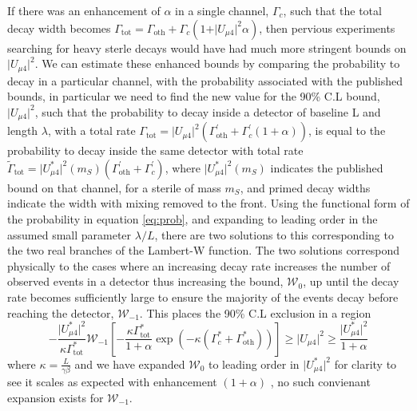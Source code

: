 \documentclass[11pt, a4paper]{article}
\begin{document}
If there was an enhancement of $\alpha$ in a single channel, $\Gamma_c$, such
that the total decay width becomes $\Gamma_\text{tot} =
\Gamma_\text{oth}+\Gamma_c (1+\vert U_{\mu 4}\vert^2 \alpha)$, then pervious
experiments searching for heavy sterle decays would have had much more
stringent bounds on $\vert U_{\mu 4} \vert^2$. We can estimate these enhanced
bounds by comparing the probability to decay in a particular channel, with the
probability associated with the published bounds, in particular we need to find
the new value for the 90\% C.L bound, $\vert U_{\mu 4}\vert^2$, such that the
probability to decay inside a detector of baseline L and length $\lambda$, with
a total rate  $\Gamma_\text{tot} = \vert U_{\mu 4}\vert^2
\left(\Gamma_\text{oth}^\prime+\Gamma_c^\prime (1+\alpha)\right)$, is equal to
the probability to decay inside the same detector with total rate
$\tilde{\Gamma}_\text{tot} = \vert U_{\mu 4}^*\vert^2(m_S)
\left(\Gamma_\text{oth}^\prime+\Gamma_c^\prime\right)$, where $\vert U_{\mu
4}^*\vert^2(m_S) $ indicates the published bound on that channel, for a sterile
of mass $m_S$, and primed decay widths indicate the width with mixing removed
to the front. Using the functional form of the probability in equation
\ref{eq:prob}, and expanding to leading order in the assumed small parameter
$\lambda/L$, there are two solutions to this corresponding to the two real
branches of the Lambert-W function. The two solutions correspond physically to
the cases where an increasing decay rate increases the number of observed
events in a detector thus increasing the bound, $\mathcal{W}_0$, up until the
decay rate becomes sufficiently large to ensure the majority of the events
decay before reaching the detector, $\mathcal{W}_{-1}$. This places the 90\%
C.L exclusion in a region \[	-\frac{\vert U_{\mu 4}^* \vert^2}{ \kappa
\Gamma_\text{tot}^{*}} \mathcal{W}_{-1} \left[-\frac{\kappa
\Gamma_\text{tot}^{*}}{1+\alpha} \exp\left(
-\kappa(\Gamma_c^*+\Gamma_\text{oth}^*) \right)     \right]	\geq \vert
U_{\mu 4} \vert^2 \geq \frac{\vert U_{\mu 4}^* \vert^2}{1+\alpha} \] where
$\kappa = \frac{L}{\gamma \beta}$ and we have expanded $\mathcal{W}_0$ to
leading order in $\vert U_{\mu 4}^*\vert^2$ for clarity to see it scales as
expected with enhancement $(1+\alpha)$ , no such convienant expansion exists
for  $\mathcal{W}_{-1}$.  
\end{document}
